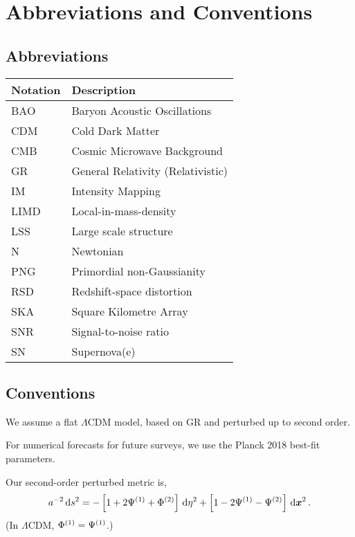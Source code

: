 \chapter*{Abbreviations and Conventions}
\label{chapter:conventions}
\section*{}
\singlespacing

\section*{Abbreviations}
\setlength{\tabcolsep}{14pt}
\begin{center}
\begin{tabular}{l | l}
	\textbf{Notation} & \textbf{Description} \\
	\hline
	BAO & Baryon Acoustic Oscillations \\
	CDM & Cold Dark Matter \\
	CMB & Cosmic Microwave Background \\
	GR & General Relativity (Relativistic) \\
	IM & Intensity Mapping \\
	LIMD & Local-in-mass-density \\
	LSS & Large scale structure \\
	N & Newtonian \\
	PNG & Primordial non-Gaussianity \\
	RSD & Redshift-space distortion \\
	SKA & Square Kilometre Array \\
	SNR & Signal-to-noise ratio \\
	SN & Supernova(e)
\end{tabular}
\end{center}
\section*{Conventions}

We assume a flat $\Lambda$CDM model, based on GR and perturbed up to second order. 

For numerical forecasts for future surveys, we use the Planck 2018 best-fit parameters.

Our second-order perturbed metric is, 
\begin{equation*}
	a^{-2} \,\mathrm{d} s^2 = - \left[ 1 + 2 \Psi^{(1)} + \Phi^{(2)} \right] \,\mathrm{d} \eta^2 + \left[ 1 - 2 \Psi^{(1)} - \Psi^{(2)} \right] \,\mathrm{d} \bm {x}^2\,.
\end{equation*}
(In $\Lambda$CDM, $\Phi^{(1)} = \Psi^{(1)}$.)

